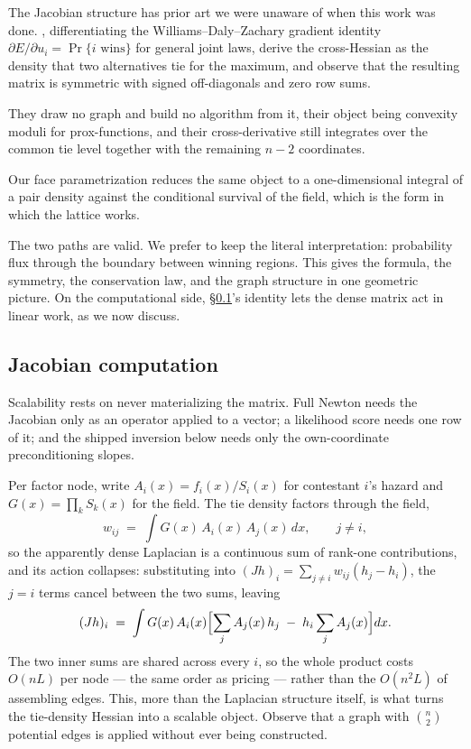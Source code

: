 \documentclass[11pt]{article}
\begin{document}
The Jacobian structure has prior art we were unaware of when this work was done.
\citet{muller2022}, differentiating the Williams--Daly--Zachary
gradient identity $\partial E/\partial u_i=\Pr\{i \text{ wins}\}$ for
general joint laws, derive the cross-Hessian as the density that two
alternatives tie for the maximum, and observe that the resulting matrix
is symmetric with signed off-diagonals and zero row sums.

They draw no graph and build no
algorithm from it, their object being convexity moduli for
prox-functions, and their cross-derivative still integrates over the
common tie level together with the remaining $n-2$ coordinates.

Our face parametrization reduces
the same object to a one-dimensional integral of a pair density against
the conditional survival of the field, which is the form in which the lattice works.

The two paths are valid. We prefer to keep the literal interpretation: probability
flux through the boundary between winning regions. This gives the formula, the symmetry, the conservation law, and the graph structure in one geometric picture. On the computational
side, \S\ref{sec:jaccomp}'s identity lets the dense matrix act in
linear work, as we now discuss.

\subsection{Jacobian computation}\label{sec:jaccomp}

Scalability rests on never materializing the matrix. Full Newton needs
the Jacobian only as an operator applied to a vector; a likelihood score
needs one row of it; and the shipped inversion below needs only the
own-coordinate preconditioning slopes.

Per factor node, write
$A_i(x)=f_i(x)/S_i(x)$ for contestant $i$'s hazard and
$G(x)=\prod_k S_k(x)$ for the field. The tie density factors through the
field,
\[
w_{ij}\;=\;\int G(x)\,A_i(x)\,A_j(x)\,dx ,\qquad j\ne i,
\]
so the apparently dense Laplacian is a continuous sum of rank-one
contributions, and its action collapses: substituting into
$(Jh)_i=\sum_{j\ne i}w_{ij}(h_j-h_i)$, the $j=i$ terms cancel between
the two sums, leaving
\[
(Jh)_i\;=\;\int G(x)\,A_i(x)
 \Bigl[\sum_{j} A_j(x)\,h_j\;-\;h_i\sum_{j} A_j(x)\Bigr]dx .
\]
The two inner sums are shared across every $i$, so the whole product
costs $O(nL)$ per node --- the same order as pricing --- rather than the
$O(n^2L)$ of assembling edges. This, more than the Laplacian structure
itself, is what turns the
tie-density Hessian into a scalable object. Observe that a graph with $\binom{n}{2}$
potential edges is applied without ever being constructed.
\end{document}
